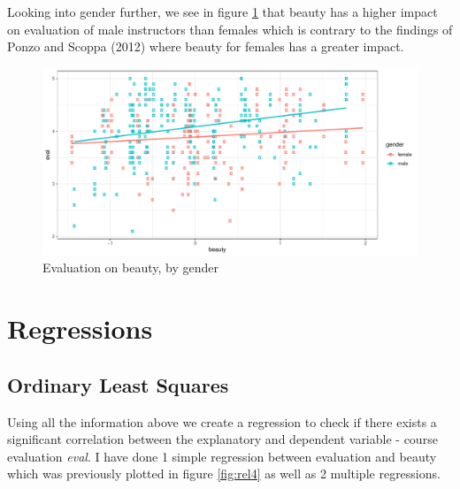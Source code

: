 \documentclass[
  12 pt,
]{article}
\begin{document}
Looking into gender further, we see in figure \ref{fig:rel5} that beauty has a higher impact on evaluation of male instructors than females which is contrary to the findings of Ponzo and Scoppa (2012) where beauty for females has a greater impact.

\begin{figure}[H]

{\centering \includegraphics{18205420_Markdown--1-_files/figure-latex/rel5-1} 

}

\caption{Evaluation on beauty, by gender}\label{fig:rel5}
\end{figure}

\hypertarget{regressions}{%
\section{Regressions}\label{regressions}}

\hypertarget{ordinary-least-squares}{%
\subsection{Ordinary Least Squares}\label{ordinary-least-squares}}

Using all the information above we create a regression to check if there exists a significant correlation between the explanatory and dependent variable - course evaluation \emph{eval}. I have done 1 simple regression between evaluation and beauty which was previously plotted in figure \ref{fig:rel4} as well as 2 multiple regressions.
\end{document}
